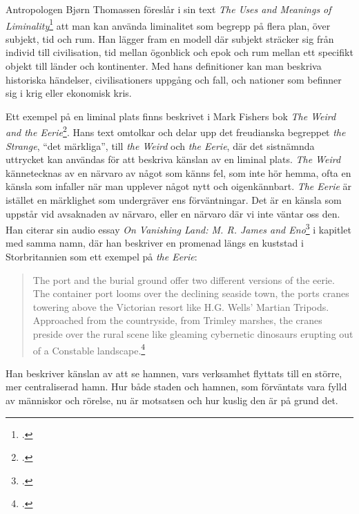 \documentclass{article}
\begin{document}
Antropologen Bjørn Thomassen föreslår i sin text \emph{The Uses and Meanings of
Liminality}\footcite[12-13]{Thomassen} att man kan använda liminalitet som begrepp på flera plan, över
subjekt, tid och rum. Han lägger fram en modell där subjekt sträcker sig från individ till civilisation, tid
mellan ögonblick och epok och rum mellan ett specifikt objekt till länder och kontinenter. Med hans
definitioner kan man beskriva historiska händelser, civilisationers uppgång och fall, och nationer som
befinner sig i krig eller ekonomisk kris.

Ett exempel på en liminal plats finns beskrivet i Mark Fishers bok \emph{The Weird and the
Eerie}\footcite[8-13]{Fisher}. Hans text omtolkar och delar upp det freudianska begreppet \emph{the Strange},
``det märkliga'', till \emph{the Weird} och \emph{the Eerie}, där det sistnämnda uttrycket kan användas för
att beskriva känslan av en liminal plats. \emph{The Weird} kännetecknas av en närvaro av något som känns fel,
som inte hör hemma, ofta en känsla som infaller när man upplever något nytt och oigenkännbart. \emph{The
Eerie} är istället en märklighet som undergräver ens förväntningar. Det är en känsla som uppstår vid
avsaknaden av närvaro, eller en närvaro där vi inte väntar oss den. Han citerar sin audio essay \emph{On
Vanishing Land: M. R. James and Eno}\footcite{onvanishingland} i kapitlet med samma namn, där han beskriver en promenad längs en
kuststad i Storbritannien som ett exempel på \emph{the Eerie}:

\begin{quote}
The port and the burial ground offer two different versions of the eerie. The container port looms over the
declining seaside town, the ports cranes towering above the Victorian resort like H.G. Wells' Martian Tripods.
Approached from the countryside, from Trimley marshes, the cranes preside over the rural scene like gleaming
	cybernetic dinosaurs erupting out of a Constable landscape.\footcite[76]{Fisher}
\end{quote}

Han beskriver känslan av att se hamnen, vars verksamhet flyttats till en större, mer centraliserad hamn. 
Hur både staden och hamnen, som förväntats vara fylld av människor och rörelse, nu är motsatsen och hur kuslig
den är på grund det.
\end{document}
